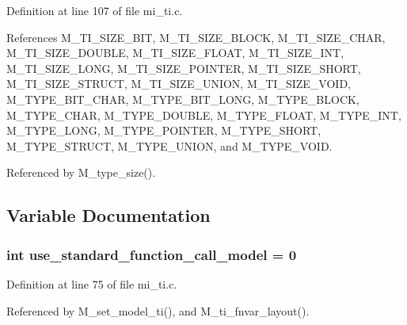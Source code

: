 Definition at line 107 of file mi\_\-ti.c.

References M\_\-TI\_\-SIZE\_\-BIT, M\_\-TI\_\-SIZE\_\-BLOCK, M\_\-TI\_\-SIZE\_\-CHAR, M\_\-TI\_\-SIZE\_\-DOUBLE, M\_\-TI\_\-SIZE\_\-FLOAT, M\_\-TI\_\-SIZE\_\-INT, M\_\-TI\_\-SIZE\_\-LONG, M\_\-TI\_\-SIZE\_\-POINTER, M\_\-TI\_\-SIZE\_\-SHORT, M\_\-TI\_\-SIZE\_\-STRUCT, M\_\-TI\_\-SIZE\_\-UNION, M\_\-TI\_\-SIZE\_\-VOID, M\_\-TYPE\_\-BIT\_\-CHAR, M\_\-TYPE\_\-BIT\_\-LONG, M\_\-TYPE\_\-BLOCK, M\_\-TYPE\_\-CHAR, M\_\-TYPE\_\-DOUBLE, M\_\-TYPE\_\-FLOAT, M\_\-TYPE\_\-INT, M\_\-TYPE\_\-LONG, M\_\-TYPE\_\-POINTER, M\_\-TYPE\_\-SHORT, M\_\-TYPE\_\-STRUCT, M\_\-TYPE\_\-UNION, and M\_\-TYPE\_\-VOID.

Referenced by M\_\-type\_\-size().

\subsection{Variable Documentation}
\subsubsection{\setlength{\rightskip}{0pt plus 5cm}int \bf{use\_\-standard\_\-function\_\-call\_\-model} = 0}\label{mi__ti_8c_0c29a3c5541686d91b2debcd367b47e9}




Definition at line 75 of file mi\_\-ti.c.

Referenced by M\_\-set\_\-model\_\-ti(), and M\_\-ti\_\-fnvar\_\-layout().